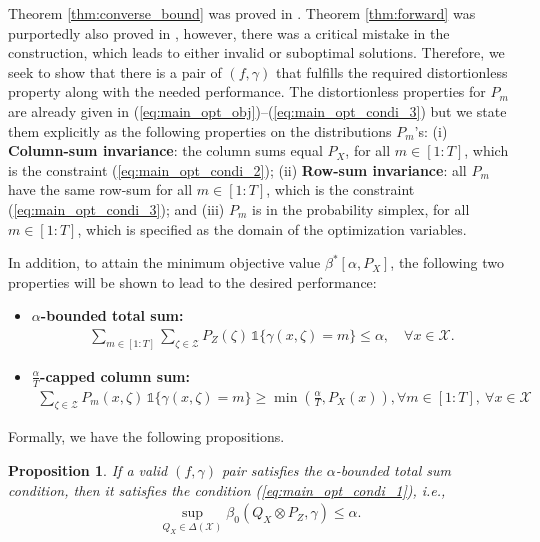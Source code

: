 \documentclass[11pt,letterpaper]{article}
\newtheorem{prop}{\textbf{Proposition}}
\newcommand{\cX}{\mathcal{X}}
\newcommand{\cZ}{\mathcal{Z}}
\begin{document}
Theorem \ref{thm:converse_bound} was proved in \cite{hedistributional}. 
Theorem \ref{thm:forward} was purportedly also proved in \cite{hedistributional}, however, there was a critical mistake in the construction, which leads to either invalid or suboptimal solutions. Therefore, we seek to show that there is a pair of $(f, \gamma)$ that fulfills the required distortionless property along with the needed performance. The distortionless properties for $P_m$ are already given in (\ref{eq:main_opt_obj})–(\ref{eq:main_opt_condi_3}) but we state them explicitly as the following properties on the distributions $P_m$'s: (i) \textbf{Column-sum invariance}: the column sums equal $P_X$, for all $m \in [1:T]$, which is the constraint (\ref{eq:main_opt_condi_2});  (ii) \textbf{Row-sum invariance}: all $P_m$ have the same row-sum for all $m \in [1:T]$, which is the constraint (\ref{eq:main_opt_condi_3}); and (iii) $P_m$ is in the probability simplex, for all $m\in[1:T]$, which is specified as the domain of the optimization variables.


In addition, to attain the minimum objective value $\beta^*[\alpha,P_X]$, the following two properties will be shown to lead to the desired performance:
\begin{itemize}
\item \textbf{$\alpha$-bounded total sum: }
\begin{align}
    \sum_{m\in [1:T]} \sum_{\zeta \in \cZ} P_{Z}(\zeta)\,\mathds{1}\{\gamma(x,\zeta) = m\}\leq \alpha, \quad \forall x \in \cX. \label{eq:alpha_bounded_total_sum}
\end{align}
\item \textbf{$\frac{\alpha}{T}$-capped column sum: } 
\begin{align}
    \sum_{\zeta \in \cZ} P_m(x,\zeta)\,\mathds{1}\{\gamma(x,\zeta) = m \} \geq \min\left(\frac{\alpha}{T}, P_X(x)\right),  \forall m \in [1:T],\ \forall x \in \cX\label{eq:alpha/M_capped_column_sum}
\end{align}
\end{itemize}

Formally, we have the following propositions. 
\begin{prop}\label{prop:alpha_bound}
If a valid $(f,\gamma)$ pair satisfies the $\alpha$-bounded total sum condition, then it satisfies the condition (\ref{eq:main_opt_condi_1}), i.e., 
\begin{align}
\sup_{Q_X\in\Delta(\cX)} \beta_0 (Q_X\otimes P_Z,\gamma) \leq \alpha. \label{eqn:alpha_bound}
\end{align}
\end{prop}
\end{document}
